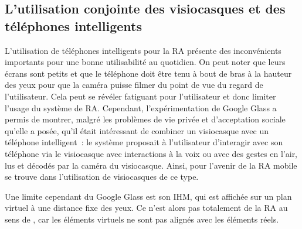 \subsection*{L'utilisation conjointe des visiocasques et des téléphones intelligents}
L'utilisation de téléphones intelligents pour la RA présente des inconvénients importants  pour une bonne utilisabilité au quotidien. On peut noter que leurs écrans sont petits et que le téléphone doit être tenu à bout de bras à la hauteur des yeux pour que la caméra puisse filmer du point de vue du regard de l'utilisateur. Cela peut se révéler fatiguant pour l'utilisateur et donc limiter l'usage du système de RA. Cependant, l'expérimentation de Google Glass a permis de montrer, malgré les problèmes de vie privée et d'acceptation sociale qu'elle a posée, qu'il était intéressant de combiner un visiocasque avec un téléphone intelligent~: le système proposait à l'utilisateur d'interagir avec son téléphone via le visiocasque avec interactions à la voix ou avec des gestes en l'air, lus et décodés par la caméra du visiocasque. Ainsi, pour \citet{HuangHuiPeyloEtAl2013} l'avenir de la RA mobile se trouve dans l'utilisation de visiocasques de ce type. 

Une limite cependant du Google Glass est son IHM, qui est affichée sur un plan virtuel à une distance fixe des yeux. Ce n'est alors pas totalement de la RA au sens de \citet{AzumaBaillotBehringerEtAl2001}, car les éléments virtuels ne sont pas alignés avec les éléments réels.

